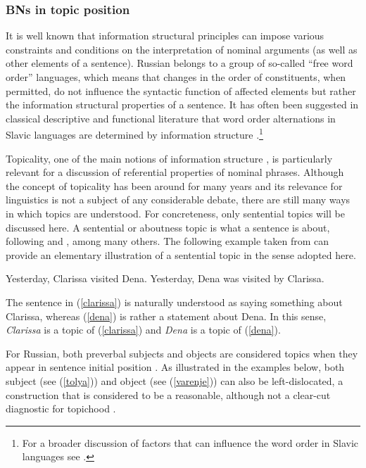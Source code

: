 \documentclass[output=paper,colorlinks,citecolor=brown]{langscibook}
\begin{document}
\subsubsection{BNs in topic position} \label{BNtopics}

It is well known that information structural principles can impose various constraints and conditions on the interpretation of nominal arguments (as well as other elements of a sentence). Russian belongs to a group of so-called ``free word order'' languages, which means that changes in the order of constituents, when permitted, do not influence the syntactic function of affected elements but rather the information structural properties of a sentence. It has often been suggested in classical descriptive and functional literature that word order alternations in Slavic languages are determined by information structure \citep[see][i.a.]{mathesius38, sgall72, hajicova74, isacenko76, yokoyama87, Comrie1981}.\footnote{For a broader discussion of factors that can influence the word order in Slavic languages see \citet{jasinsimik}.} 

Topicality, one of the main notions of information structure \citep[see, for instance,][]{krifka08}, is particularly relevant for a discussion of referential properties of nominal phrases. Although the concept of topicality has been around for many years and its relevance for linguistics is not a subject of any considerable debate, there are still many ways in which topics are understood. For concreteness, only sentential topics will be discussed here. A sentential or aboutness topic is what a sentence is about, following \citet{reinhart81} and \citet{endriss09}, among many others. The following example taken from \citet[20]{endriss09} can provide an elementary illustration of a sentential topic in the sense adopted here. 

\ea
\ea Yesterday, Clarissa visited Dena. \label{clarissa}
\ex Yesterday, Dena was visited by Clarissa.  \label{dena}
\z
\z

\noindent The sentence in (\ref{clarissa}) is naturally understood as saying something about Clarissa, whereas (\ref{dena}) is rather a statement about Dena. In this sense, \textit{Clarissa} is a topic of (\ref{clarissa}) and \textit{Dena} is a topic of (\ref{dena}). 

For Russian, both preverbal subjects and objects are considered topics when they appear in sentence initial position \citep[cf.][]{jasinskaja16}. As illustrated in the examples below, both subject (see (\ref{tolya})) and object (see (\ref{varenje})) can also be left-dislocated, a construction that is considered to be a reasonable, although not a clear-cut diagnostic for topichood \citep[see][]{reinhart81}.
\end{document}

